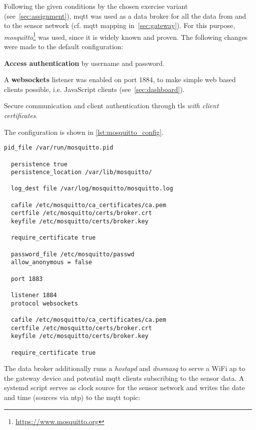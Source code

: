 Following the given conditions by the chosen exercise variant (see~\cref{sec:assignment}), \gls{mqtt} was used as a data broker for all the data from and to the sensor network (cf. \gls{mqtt} mapping in~\cref{sec:gateway}).
For this purpose, \textit{mosquitto}\footnote{\url{https://www.mosquitto.org}} was used, since it is widely known and proven. The following changes were made to the default configuration:

\begin{compactitem}
  \item \textbf{Access authentication} by username and password.
  \item A \textbf{websockets} listener was enabled on port 1884, to make simple web based clients possible, i.e. JavaScript clients (see~\cref{sec:dashboard}).
  \item Secure communication and client authentication through \gls{tls} \emph{with client certificates}.
\end{compactitem}

The configuration is shown in \cref{lst:mosquitto_config}.

\begin{lstlisting}[label=lst:mosquitto_config,caption="Mosquitto configuration"]
  pid_file /var/run/mosquitto.pid

  persistence true
  persistence_location /var/lib/mosquitto/

  log_dest file /var/log/mosquitto/mosquitto.log

  cafile /etc/mosquitto/ca_certificates/ca.pem
  certfile /etc/mosquitto/certs/broker.crt
  keyfile /etc/mosquitto/certs/broker.key

  require_certificate true

  password_file /etc/mosquitto/passwd
  allow_anonymous = false

  port 1883

  listener 1884
  protocol websockets

  cafile /etc/mosquitto/ca_certificates/ca.pem
  certfile /etc/mosquitto/certs/broker.crt
  keyfile /etc/mosquitto/certs/broker.key

  require_certificate true
\end{lstlisting}

The data broker additionally runs a \textit{hostapd} and \textit{dnsmasq} to serve a WiFi \gls{ap} to the gateway device and potential \gls{mqtt} clients subscribing to the sensor data. A systemd script serves as clock source for the sensor network and writes the date and time (sources via ntp) to the \gls{mqtt} topic:

